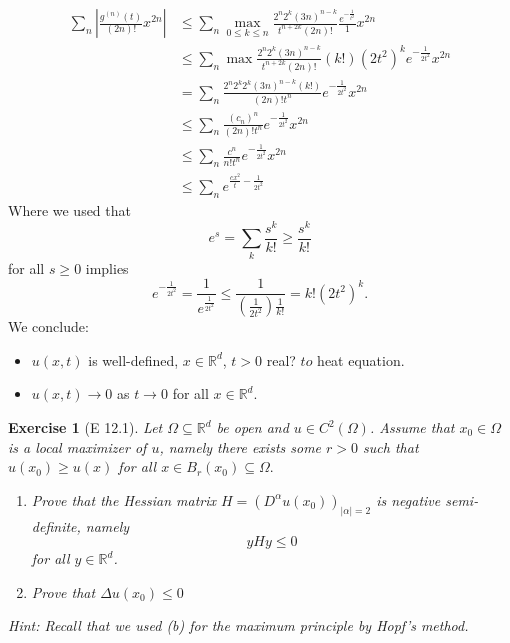 \documentclass{report}
\theoremstyle{tommy}
\newtheorem{ex}[defn]{Exercise}
\begin{document}
  \begin{align*}
    \sum_{n} \left|\frac{g^{(n)}(t)}{(2n)!} x^{2n}\right| &
    \le \sum_n \max_{0 \le k \le n} \frac{2^n 2^k (3n)^{n-k}}{t^{n+2k}(2n)!} \frac{e^{-\frac{1}{t^2}}}{1} x^{2n} \\
    &\le \sum_{n} \max \frac{2^n 2^k (3n)^{n-k}}{t^{n+2k}(2n)!} (k!)(2t^2)^k e^{- \frac{1}{2t^2}} x^{2n} \\
    &= \sum_{n} \frac{2^n 2^k 2^k (3n)^{n-k}(k!)}{(2n)!t^n} e^{- \frac{1}{2t^2}} x^{2n} \\
    &\le \sum_{n} \frac{(c_n)^n}{(2n)!t^n} e^{- \frac{1}{2t^2}} x^{2n}\\
    &\le \sum_{n} \frac{c^n}{n!t^n} e^{- \frac{1}{2t^2}} x^{2n} \\
    &\le \sum_{n} e^{\frac{cx^2}{t}-\frac{1}{2t^2}}
  \end{align*}
  Where we used that
  \[e^s = \sum_k \frac{s^k}{k!} \ge \frac{s^k}{k!}\]
  for all \(s \ge 0\) implies 
  \[e^{- \frac{1}{2t^2}} = \frac{1}{e^{\frac{1}{2t^2}}} \le \frac{1}{\left(\frac{1}{2t^2}\right) \frac{1}{k!}} = k!(2t^2)^k.\]
  We conclude:
  \begin{itemize}
    \item \(u(x,t)\) is well-defined, \(x \in \mathbb{R}^d\), \(t > 0\) real? \(to\) heat equation. 
    \item \(u(x,t) \to 0\) as \(t \to 0\) for all \(x \in \mathbb{R}^d\).
  \end{itemize}

  \begin{ex}[E 12.1]
    Let \(\Omega \subseteq \mathbb{R}^d\) be open and \(u \in C^2(\Omega)\). Assume that \(x_0 \in \Omega\) is a local maximizer of \(u\), namely there exists some \(r > 0\) such that 
    \(u(x_0) \ge u(x)\)
    for all \(x \in B_r(x_0) \subseteq \Omega.\)
    \begin{enumerate}[label=(\alph*)]
      \item Prove that the Hessian matrix \(H = (D^\alpha u(x_0))_{|\alpha|=2}\) is negative semi-definite, namely \[y H y \le 0\]
      for all \(y \in \mathbb{R}^d\).
      \item Prove that \(\Delta u(x_0) \le 0\)
    \end{enumerate}
    Hint: Recall that we used (b) for the maximum principle by Hopf's method.
  \end{ex}
\end{document}

